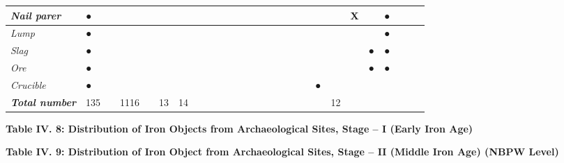 \begin{longtable}{|l|l|l|l|l|l|l|l|l|l|l|l|l|l|l|l|l|l|l|l|l|l|l|l|l|l|l|}
\hline
\textit{Nail parer} & ● &  &  &  &  &  &  &  &  &  &  &  &  &  &  &  &  &  &  &  & X &  & ● &  &  &  \\
\hline
\textit{Lump} & ● &  &  &  &  &  &  &  &  &  &  &  &  &  &  &  &  &  &  &  &  &  & ● &  &  &  \\
\hline
\textit{Slag} & ● &  &  &  &  &  &  &  &  &  &  &  &  &  &  &  &  &  &  &  &  & ● & ● &  &  &  \\
\hline
\textit{Ore} & ● &  &  &  &  &  &  &  &  &  &  &  &  &  &  &  &  &  &  &  &  & ● & ● &  &  &  \\
\hline
\textit{Crucible} & ● &  &  &  &  &  &  &  &  &  &  &  &  &  &  &  &  &  & ● &  &  &  &  &  &  &  \\
\hline
\textit{\textbf{Total number}} & 135 &  & 1116 &  & 13 & 14 &  &  &  &  &  &  &  &  &  &  &  &  &  & 12 &  &  &  &  &  &  \\
\hline
\end{longtable}

\textbf{Table IV. 8: Distribution of Iron Objects from Archaeological Sites, Stage – I (Early Iron Age)}

\textbf{Table IV. 9: Distribution of Iron Object from Archaeological Sites, Stage – II (Middle Iron Age) (NBPW Level)}

